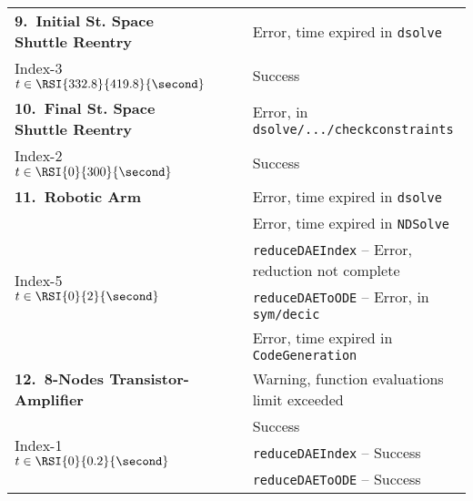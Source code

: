 {\begin{longtable}{lccl}
  \multirow{1}{*}{\textbf{9.~Initial St. Space Shuttle Reentry}} %
    & \Maple{}  & \mycrossmark{}\phantom{\mywarnmark{}} & Error, time expired in \texttt{dsolve} \\ \cmidrule{2-4}
    Index-3 \quad $t \in \RSI{332.8}{419.8}{\second}$ & \Indigo{} & \mycheckmark{}\phantom{\mywarnmark{}} & Success \\ \midrule
  \multirow{1}{*}{\textbf{10.~Final St. Space Shuttle Reentry}} %
    & \Maple{}  & \mycrossmark{}\phantom{\mywarnmark{}} & Error, in \texttt{dsolve/.../checkconstraints} \\ \cmidrule{2-4}
    Index-2 \quad $t \in \RSI{0}{300}{\second}$ & \Indigo{} & \mycheckmark{}\phantom{\mywarnmark{}} & Success \\ \midrule
  \multirow{1}{*}{\textbf{11.~Robotic Arm}} %
    & \Maple{}       & \mycrossmark{}\phantom{\mywarnmark{}} & Error, time expired in \texttt{dsolve} \\ \cmidrule{2-4}
    \multirow{4}{*}{Index-5 \quad $t \in \RSI{0}{2}{\second}$}
    & \Mathematica{} & \mycrossmark{}\phantom{\mywarnmark{}} & Error, time expired in \texttt{NDSolve} \\ \cmidrule{2-4}
    & \multirow{2}{*}{\Matlab{}} & \mycrossmark{}\phantom{\mywarnmark{}} & \texttt{reduceDAEIndex} -- Error, reduction not complete \\ \cmidrule{3-4}
    &                            & \mycrossmark{}\phantom{\mywarnmark{}} & \texttt{reduceDAEToODE} -- Error, in \texttt{sym/decic} \\ \cmidrule{2-4}
    & \Indigo{} & \mycrossmark{}\phantom{\mywarnmark{}} & Error, time expired in \texttt{CodeGeneration} \\ \midrule
  \multirow{1}{*}{\textbf{12.~8-Nodes Transistor-Amplifier}} %
    & \Maple{}       & \mycheckmark{}\mywarnmark{} & Warning, function evaluations limit exceeded \\ \cmidrule{2-4}
    \multirow{4}{*}{Index-1 \quad $t \in \RSI{0}{0.2}{\second}$} & \Mathematica{} & \mycheckmark{}\phantom{\mywarnmark{}} & Success \\ \cmidrule{2-4}
    & \multirow{2}{*}{\Matlab{}} & \mycheckmark{}\phantom{\mywarnmark{}} & \texttt{reduceDAEIndex} -- Success \\ \cmidrule{3-4}
    &                            & \mycheckmark{}\phantom{\mywarnmark{}} & \texttt{reduceDAEToODE} -- Success \\ \cmidrule{2-4}\cmidrule{2-4}

\end{longtable}}
